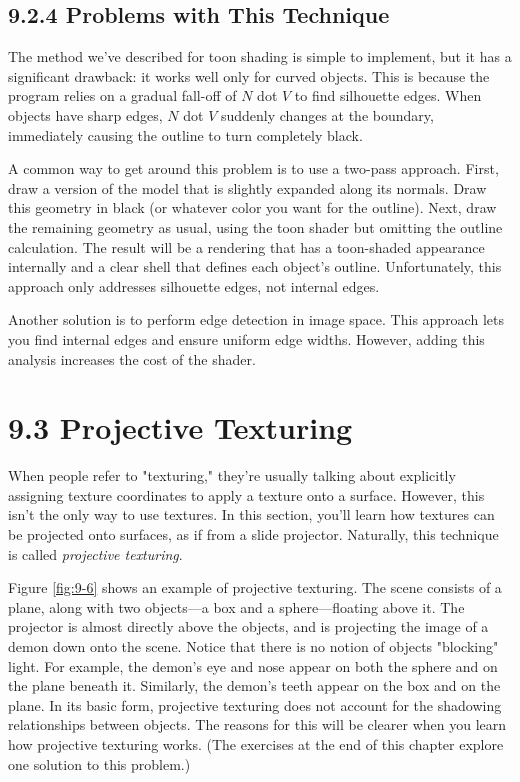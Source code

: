 \documentclass[../main.tex]{subfiles}
\begin{document}
\subsection{9.2.4 Problems with This Technique}

The method we've described for toon shading is simple to implement, but it has a significant drawback: it works well only for curved objects. This is because the program relies on a gradual fall-off of $N$ dot $V$ to find silhouette edges. When objects have sharp edges, $N$ dot $V$ suddenly changes at the boundary, immediately causing the outline to turn completely black.

A common way to get around this problem is to use a two-pass approach. First, draw a version of the model that is slightly expanded along its normals. Draw this geometry in black (or whatever color you want for the outline). Next, draw the remaining geometry as usual, using the toon shader but omitting the outline calculation. The result will be a rendering that has a toon-shaded appearance internally and a clear shell that defines each object's outline. Unfortunately, this approach only addresses silhouette edges, not internal edges.

Another solution is to perform edge detection in image space. This approach lets you find internal edges and ensure uniform edge widths. However, adding this analysis increases the cost of the shader.

\section{9.3 Projective Texturing}

When people refer to "texturing," they're usually talking about explicitly assigning texture coordinates to apply a texture onto a surface. However, this isn't the only way to use textures. In this section, you'll learn how textures can be projected onto surfaces, as if from a slide projector. Naturally, this technique is called \textit{projective texturing}.

Figure \ref{fig:9-6} shows an example of projective texturing. The scene consists of a plane, along with two objects—a box and a sphere—floating above it. The projector is almost directly above the objects, and is projecting the image of a demon down onto the scene. Notice that there is no notion of objects "blocking" light. For example, the demon's eye and nose appear on both the sphere and on the plane beneath it. Similarly, the demon's teeth appear on the box and on the plane. In its basic form, projective texturing does not account for the shadowing relationships between objects. The reasons for this will be clearer when you learn how projective texturing works. (The exercises at the end of this chapter explore one solution to this problem.)
\end{document}
